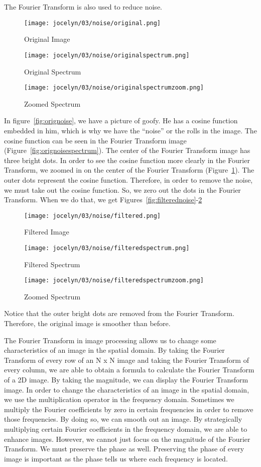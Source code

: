 \documentclass [../article.tex]{subfiles}
\begin{document}
  The Fourier Transform is also used to reduce noise.
  \begin{figure}[htbp]
    \texttt{[image: jocelyn/03/noise/original.png]}
    \caption{Original Image}
    \label{fig:orignoise}
  \endminipage\hfill
    \texttt{[image: jocelyn/03/noise/originalspectrum.png]}
    \caption{Original Spectrum}
    \label{fig:orignoisespectrum}
  \endminipage\hfill
    \texttt{[image: jocelyn/03/noise/originalspectrumzoom.png]}
    \caption{Zoomed Spectrum}
    \label{fig:origzoomed}
  \endminipage
  \end{figure}
  In figure~\ref{fig:orignoise}, we have a picture of goofy. He
  has a cosine function embedded in him, which is why we have the
  ``noise'' or the rolls in the image. The cosine function can
  be seen in the Fourier Transform image
  (Figure~\ref{fig:orignoisespectrum}).  The center of
  the Fourier Transform image has three bright dots.  In order to
  see the cosine function more clearly in the Fourier Transform, we
  zoomed in on the center of the Fourier Transform (Figure~\ref{fig:origzoomed}).  The outer dots represent the cosine function.
  Therefore, in order to remove the noise, we must take out the
  cosine function.  So, we zero out the dots in the Fourier
  Transform.  When we do that, we get Figures~\ref{fig:filterednoise}-\ref{fig:filteredzoom}
  \begin{figure}[htbp]
    \texttt{[image: jocelyn/03/noise/filtered.png]}
    \caption{Filtered Image}
    \label{fig:filterednoise}
  \endminipage\hfill
    \texttt{[image: jocelyn/03/noise/filteredspectrum.png]}
    \caption{Filtered Spectrum}
    \label{fig:filteredspectrum}
  \endminipage\hfill
    \texttt{[image: jocelyn/03/noise/filteredspectrumzoom.png]}
    \caption{Zoomed Spectrum}
    \label{fig:filteredzoom}
  \endminipage
  \end{figure}
  Notice that the outer bright dots are removed from the Fourier
  Transform.  Therefore, the original image is smoother than before.

  The Fourier Transform in image processing allows us to change some
  characteristics of an image in the spatial domain.  By taking the
  Fourier Transform of every row of an N x N image and taking the
  Fourier Transform of every column, we are able to obtain a formula
  to calculate the Fourier Transform of a 2D image.  By taking the
  magnitude, we can display the Fourier Transform image.  In order
  to change the characteristics of an image in the spatial domain,
  we use the multiplication operator in the frequency domain.
  Sometimes we multiply the Fourier coefficients by zero in certain
  frequencies in order to remove those frequencies.  By doing so, we
  can smooth out an image.  By strategically multiplying certain
  Fourier coefficients in the frequency domain, we are able to
  enhance images.  However, we cannot just focus on the magnitude of
  the Fourier Transform.  We must preserve the phase as well.
  Preserving the phase of every image is important as the phase
  tells us where each frequency is located.
\end{document}
